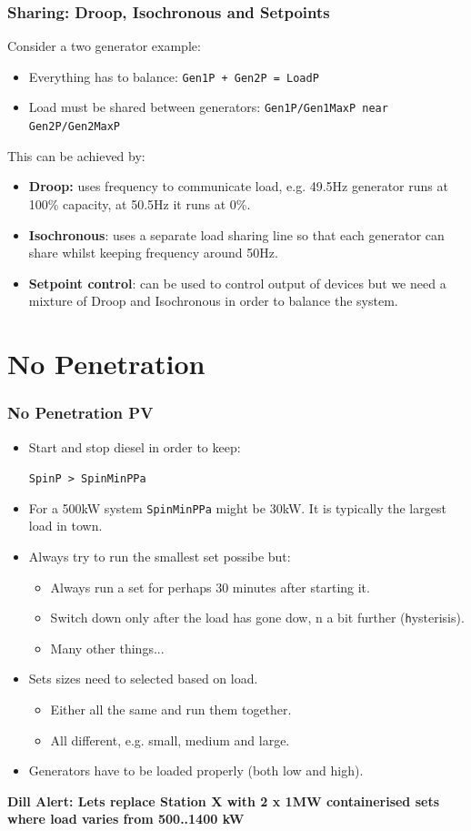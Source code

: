 \documentclass{beamer}
\def\dill#1{\textcolor{RawSienna}{\textbf{Dill Alert: #1}}}
\begin{document}
\begin{frame}\frametitle{Sharing: Droop, Isochronous and Setpoints}
Consider a two generator example:\pause
  \begin{itemize}
  \item Everything has to balance: \texttt{Gen1P + Gen2P = LoadP}\pause
  \item Load must be shared between generators: 
    \texttt{Gen1P/Gen1MaxP near Gen2P/Gen2MaxP}
  \end{itemize}
  This can be achieved by:
  \begin{itemize}
  \item \textbf{Droop:} uses frequency to communicate load, e.g.
    49.5Hz generator runs at 100\% capacity, at 50.5Hz it runs at 0\%.
    \pause
  \item \textbf{Isochronous}: uses a separate load sharing line 
    so that each generator can share whilst keeping frequency around
    50Hz.\pause
  \item \textbf{Setpoint control}: can be used to control output of
    devices but we need a mixture of Droop and Isochronous in order to
    balance the system.
  \end{itemize}
\end{frame}

\section{No Penetration}
\begin{frame}\frametitle{No Penetration PV}
  \begin{itemize}
  \item Start and stop diesel in order to keep:
    
    \texttt{SpinP > SpinMinPPa} 
  \item For a 500kW system \texttt{SpinMinPPa} might
    be 30kW. It is typically the largest load in town.  \pause
  \item Always try to run the smallest set possibe but:
    \begin{itemize}
    \item Always run a set for perhaps 30 minutes after starting it.
    \item Switch down only after the load has gone dow, n a bit further
      (\texttt hysterisis).
    \item Many other things...
    \end{itemize}
    \pause
  \item Sets sizes need to selected based on load.
    \begin{itemize}
    \item Either all the same and run them together.
    \item All different, e.g. small, medium and large.
    \end{itemize}
    \pause
  \item Generators have to be loaded properly (both low and high).
  \end{itemize}
  \pause
  \dill{Lets replace Station X with 2 x 1MW containerised sets where 
  load varies from 500..1400 kW}
\end{frame}
\end{document}

